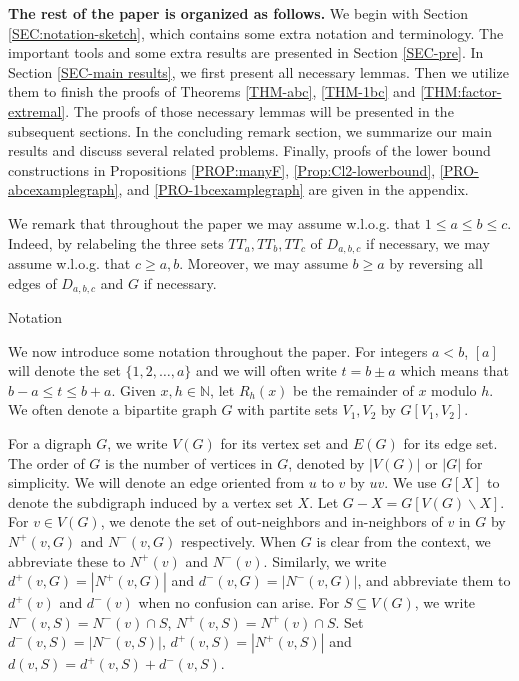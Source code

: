 \documentclass[11pt,a4paper,reqno]{amsart}
\makeatletter
\renewcommand\section{\@startsection{section}{1}%
  \z@{-1.0\linespacing\@plus-.7\linespacing}{1\linespacing}%
  {\normalfont\bfseries\large\centering}}
\theoremstyle{definition} %
\makeatother
\begin{document}
\medskip

\textbf{The rest of the paper is organized as follows.}   We begin with Section \ref{SEC:notation-sketch}, which contains some extra notation and terminology.  The important tools and some extra results are presented in Section \ref{SEC-pre}.  In Section \ref{SEC-main results}, we first present all necessary lemmas. Then we utilize them to finish the proofs of Theorems \ref{THM-abc}, \ref{THM-1bc} and \ref{THM:factor-extremal}.  The proofs of those necessary lemmas will be presented in the subsequent sections.  In the concluding remark section, we summarize our main results and discuss several related problems. Finally, proofs of the lower bound constructions in Propositions \ref{PROP:manyF}, \ref{Prop:Cl2-lowerbound}, \ref{PRO-abcexamplegraph}, and \ref{PRO-1bcexamplegraph} are given in the appendix. 


\medskip


We remark that throughout the paper we may  assume w.l.o.g. that $1\leqslant a\leqslant b\leqslant c$. Indeed, by relabeling the three sets $TT_a,TT_b,TT_c$ of $D_{a,b,c}$ if necessary, we may  assume w.l.o.g. that $c\geqslant a,b$. Moreover, we may assume $b\geqslant a$ by reversing all edges of $D_{a,b,c}$ and $G$ if necessary. 


\section{Notation}\label{SEC:notation-sketch}




 We now introduce some notation throughout the paper.
For integers $a<b$, $[a]$ will denote the set $\{1,2,\ldots, a\}$ and we will often write $t= b\pm a$ which means that $b-a\leqslant t\leqslant b+a$.  Given $x,h\in\mathbb{N}$, let $R_h(x)$ be the remainder of $x$ modulo $h$.   
We often denote a bipartite graph $G$ with partite sets $V_1,V_2$ by $G[V_1,V_2]$. 


For a digraph $G$, we write $V(G)$ for its vertex set and $E(G)$ for its edge set. The order of $G$ is the number of vertices in $G$,  denoted by $|V(G)|$ or $|G|$ for simplicity.  We will denote an edge oriented from $u$ to $v$ by $uv$. We use $G[X]$ to denote the subdigraph induced by a vertex set $X$. Let $G-X = G[V(G)\backslash X]$.   For $v\in V(G)$, we denote the set of out-neighbors and in-neighbors of $v$ in $G$ by $N^+(v,G)$ and $N^-(v,G)$ respectively.  When $G$ is clear from the context, we abbreviate these to $N^+(v)$ and $N^-(v)$. Similarly, we write $d^+(v,G)=|N^+(v,G)|$ and $d^-(v,G)=|N^-(v,G)|$, and abbreviate them to $d^+(v)$ and $d^-(v)$ when no confusion can arise. For $S\subseteq V(G)$, we write $N^-(v,S)=N^-(v)\cap S$, $N^+(v,S)=N^+(v)\cap S$. Set $d^-(v,S)=|N^-(v,S)|$, $d^+(v,S)=|N^+(v, S)|$ and $d(v,S)=d^+(v,S)+d^-(v,S)$. 
\end{document}
